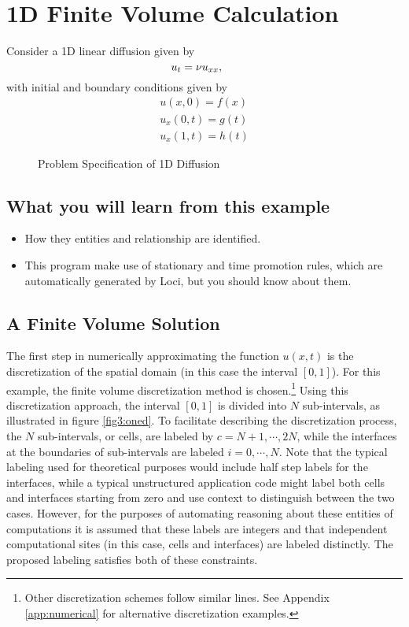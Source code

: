 \section { 1D Finite Volume Calculation}
Consider a 1D linear diffusion given by
\begin{equation}
u_t = \nu u_{xx}, \hspace{5mm}
\end{equation}
with initial and boundary conditions given by
\begin{eqnarray}
u(x,0) = f(x)    \\
u_x(0,t) = g(t)  \\
u_x(1,t) = h(t)
\end{eqnarray}

\begin{figure}[h]
\vspace*{1.60in}\caption {Problem Specification of 1D Diffusion }
\end{figure}

\subsection{ What you will learn from this example }
\begin{itemize}
\item  How they entities and relationship are identified.
\item  This program make use of stationary and time promotion rules,
       which are automatically generated by Loci, but you should
       know about them.
\end{itemize}
      

\subsection{A Finite Volume Solution}

The first step in numerically approximating the function $u(x,t)$ is
the discretization of the spatial domain (in this case the interval
$[0,1]$).  For this example, the finite volume discretization method
is chosen.\footnote{Other discretization schemes follow similar lines.
  See Appendix \ref{app:numerical} for alternative discretization
  examples.} Using this discretization approach, the interval $[0,1]$
is divided into $N$ sub-intervals, as illustrated in figure
\ref{fig3:oned}.  To facilitate describing the discretization process,
the $N$ sub-intervals, or cells, are labeled by $c = N+1, \cdots, 2N$,
while the interfaces at the boundaries of sub-intervals are labeled $i
= 0, \cdots, N$.  Note that the typical labeling used for theoretical
purposes would include half step labels for the interfaces, while a
typical unstructured application code might label both cells and
interfaces starting from zero and use context to distinguish between
the two cases.  However, for the purposes of automating reasoning
about these entities of computations it is assumed that these labels
are integers and that independent computational sites (in this case,
cells and interfaces) are labeled distinctly.  The proposed labeling
satisfies both of these constraints.

